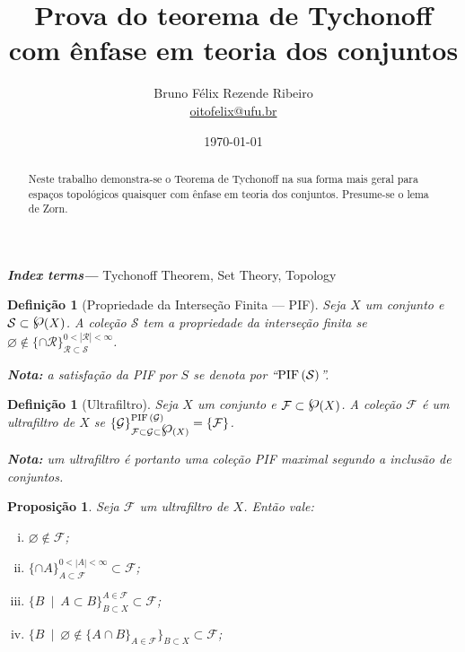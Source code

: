 \documentclass{article}
\title{Prova do teorema de Tychonoff com ênfase em teoria dos conjuntos}
\author{Bruno Félix Rezende Ribeiro \\ \href{mailto:oitofelix@ufu.br}{oitofelix@ufu.br}}
\affil{FAMAT ---  Universidade Federal de Uberlândia}
\date{\today}
\newtheorem{definition}[theorem]{Definição}
\newtheorem{proposition}[theorem]{Proposição}
\providecommand{\keywords}[1]{\textbf{\textit{Index terms---}} #1}
\newcommand{\powerset}{\raisebox{.15\baselineskip}{\Large\ensuremath{\wp}}}
\newcommand{\suchthat}{\enspace|\enspace}
\newcommand{\fip}[1]{\text{PIF\,}(#1)}
\begin{document}
\maketitle

\begin{abstract}
  Neste trabalho demonstra-se o Teorema de Tychonoff na sua forma mais
  geral para espaços topológicos quaisquer com ênfase em teoria dos
  conjuntos.  Presume-se o lema de Zorn.
\end{abstract}

\keywords{Tychonoff Theorem, Set Theory, Topology}

\begin{definition}[Propriedade da Interseção Finita --- PIF]
  Seja \(X\) um conjunto e \(\mathcal{S} \subset \powerset(X)\).  A
  coleção \(\mathcal{S}\) tem a propriedade da interseção finita se
  \(\varnothing \notin \{\cap \mathcal{R}\}_{\mathcal{R} \subset
    \mathcal{S}}^{0 < |\mathcal{R}| < \infty}\).

  \vspace{0.5em}\noindent\textbf{Nota:} a satisfação da PIF por \(S\)
  se denota por ``\(\fip{\mathcal{S}}\)''.
\end{definition}

\begin{definition}[Ultrafiltro]
  Seja \(X\) um conjunto e \(\mathcal{F} \subset \powerset(X)\).  A
  coleção \(\mathcal{F}\) é um ultrafiltro de \(X\) se
  \(\{\mathcal{G}\}_{\mathcal{F}\subset
    \mathcal{G}\subset\powerset(X)}^{\fip{\mathcal{G}}}=\{\mathcal{F}\}\).

  \vspace{0.5em}\noindent\textbf{Nota:} um ultrafiltro é portanto uma
  coleção PIF maximal segundo a inclusão de conjuntos.
\end{definition}

\begin{proposition}\label{uf_prop}
  Seja \(\mathcal{F}\) um ultrafiltro de \(X\).  Então vale:
  \begin{enumerate}[(i)]
  \item \(\varnothing \notin \mathcal{F}\);
  \item \(\{\cap A\}_{A \subset \mathcal{F}}^{0 < |A|<\infty} \subset \mathcal{F}\);
  \item \(\{B \suchthat A \subset B\}_{B\subset X}^{A\in \mathcal{F}}
    \subset \mathcal{F}\);
  \item \(\{B \suchthat \varnothing \notin \{A \cap B\}_{A \in \mathcal{F}}
    \}_{B \subset X} \subset \mathcal{F}\);
  \end{enumerate}
\end{proposition}
\end{document}
